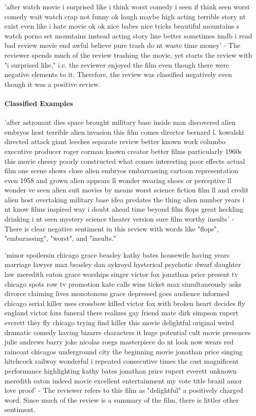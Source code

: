 \documentclass[11pt]{article}
\begin{document}
'after watch movie i surprised like i think worst comedy i seen if think
seen worst comedy wait watch crap not funny ok laugh maybe high acting
terrible story nt exist even like i hate movie ok ok nice babes nice
tricks beautiful mountains s watch porno set mountains instead acting
story line better sometimes imdb i read bad review movie end awful
believe pure trash do nt waste time money' - The reviewer spends much of
the review trashing the movie, yet starts the review with "i surprised
like," i.e. the reviewer enjoyed the film even though there were
negative elements to it. Therefore, the review was classified negatively
even though it was a positive review.

    \paragraph{Classified Examples}\label{classified-examples}

'after astronaut dies space brought military base inside man discovered
alien embryos host terrible alien invasion this film comes director
bernard l. kowalski directed attack giant leeches separate review better
known work columbo executive producer roger corman known creator better
films particularly 1960s this movie cheesy poorly constructed what comes
interesting poor effects actual film one scene shows close alien embryos
embarrassing cartoon representation even 1958 and grown alien appears ll
wonder wearing shoes or perceptive ll wonder ve seen alien suit movies
by means worst science fiction film ll and credit alien host overtaking
military base idea predates the thing alien number years i nt know films
inspired way i doubt ahead time beyond film flops great heckling
drinking i nt seen mystery science theater version sure film worthy
insults' - There is clear negative sentiment in this review with words
like "flops", "embarassing", "worst", and "insults."

'minor spoilersin chicago grace beasley kathy bates housewife having
years marriage lawyer max beasley dan aykroyd hysterical psychotic dwarf
daughter law meredith eaton grace worships singer victor fox jonathan
price present tv chicago spots row tv promotion kate calls wins ticket
max simultaneously asks divorce claiming lives monotonous grace
depressed goes audience informed chicago serial killer uses crossbow
killed victor fox with broken heart decides fly england victor foxs
funeral there realizes gay friend mate dirk simpson rupert everett they
fly chicago trying find killer this movie delightful original weird
dramatic comedy having bizarre characters it huge potential cult movie
presences julie andrews barry joke nicolas roegs masterpiece do nt look
now wears red raincoat chicagos underground city the beginning movie
jonathan price singing hitchcock railway wonderful i repeated
consecutive times the cast magnificent performance highlighting kathy
bates jonathan price rupert everett unknown meredith eaton indeed movie
excellent entertainment my vote title brazil amor love proof' - The
reviewer refers to this film as "delightful" a positively charged word.
Since much of the review is a summary of the film, there is littler
other sentiment.
\end{document}
